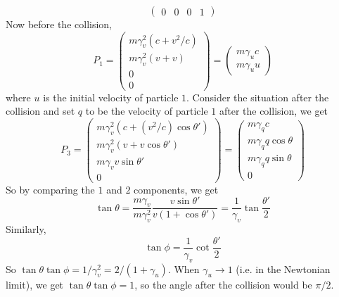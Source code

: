 \begin{example}
$$\begin{pmatrix}
        0&0&0&1
    \end{pmatrix}$$
    Now before the collision,
    $$P_1=\begin{pmatrix}
        m\gamma_v^2(c+v^2/c)\\
        m\gamma_v^2(v+v)\\
        0\\
        0
    \end{pmatrix}=\begin{pmatrix}
        m\gamma_uc\\
        m\gamma_uu
    \end{pmatrix}$$
    where $u$ is the initial velocity of particle $1$.
    Consider the situation after the collision and set $q$ to be the velocity of particle $1$ after the collision, we get
    $$P_3=\begin{pmatrix}
        m\gamma_v^2(c+(v^2/c)\cos\theta')\\
        m\gamma_v^2(v+v\cos\theta')\\
        m\gamma_vv\sin\theta'\\
        0
    \end{pmatrix}=\begin{pmatrix}
        m\gamma_qc\\
        m\gamma_qq\cos\theta\\
        m\gamma_qq\sin\theta\\
        0
    \end{pmatrix}$$
    So by comparing the $1$ and $2$ components, we get
    $$\tan\theta=\frac{m\gamma_v}{m\gamma_v^2}\frac{v\sin\theta'}{v(1+\cos\theta')}=\frac{1}{\gamma_v}\tan\frac{\theta'}{2}$$
    Similarly,
    $$\tan\phi=\frac{1}{\gamma_v}\cot\frac{\theta'}{2}$$
    So $\tan\theta\tan\phi=1/\gamma_v^2=2/(1+\gamma_u)$.
    When $\gamma_u\to 1$ (i.e. in the Newtonian limit), we get $\tan\theta\tan\phi=1$, so the angle after the collision would be $\pi/2$.
\end{example}